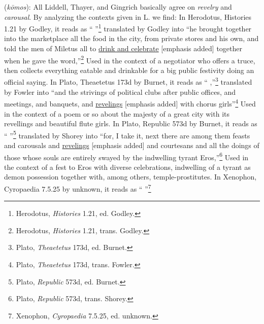 \item[Revel,]

(\textit{kōmos}):
All Liddell, Thayer, and Gingrich basically agree on \emph{revelry} and \emph{carousal}. By analyzing the contexts given in L. we find: 
In Herodotus, Histories 1.21 by Godley, it reads as `` \underline{} ''\footnote{Herodotus, \emph{Histories} 1.21, ed. Godley.}
translated by Godley into ``he brought together into the marketplace all the food in the city, from private stores and his own, and told the men of Miletus all to \underline{drink and celebrate} [emphasis added] together when he gave the word,''\footnote{Herodotus, \emph{Histories} 1.21, trans. Godley.} 
Used in the context of a negotiator who offers a truce, then collects everything eatable and drinkable for a big public festivity doing an official saying. 
In Plato, Theaetetus 173d by Burnet, it reads as `` \underline{},''\footnote{Plato, \emph{Theaetetus} 173d, ed. Burnet.}
translated by Fowler into ``and the strivings of political clubs after public offices, and meetings, and banquets, and \underline{revelings} [emphasis added] with chorus girls''\footnote{Plato, \emph{Theaetetus} 173d, trans. Fowler.} 
Used in the context of a poem or so about the majesty of a great city with its revellings and beautiful flute girls.
In Plato, Republic 573d by Burnet, it reads as `` \underline{} ''\footnote{Plato, \emph{Republic} 573d, ed. Burnet.}
translated by Shorey into ``for, I take it, next there are among them feasts and carousals and \underline{revelings} [emphasis added] and courtesans and all the doings of those whose souls are entirely swayed by the indwelling tyrant Eros,''\footnote{Plato, \emph{Republic} 573d, trans. Shorey.}
Used in the context of a fest to Eros with diverse celebrations, indwelling of a tyrant as demon possession together with, among others, temple-prostitutes. 
In Xenophon, Cyropaedia 7.5.25 by unknown, it reads as ``\underline{} ''\footnote{Xenophon, \emph{Cyropaedia} 7.5.25, ed. unknown.}
